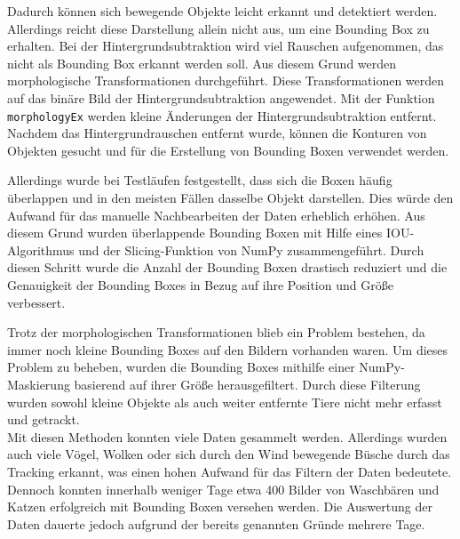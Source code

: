 Dadurch können sich bewegende Objekte leicht erkannt und detektiert werden. Allerdings reicht diese Darstellung allein nicht aus, um eine Bounding Box zu erhalten. Bei der Hintergrundsubtraktion wird viel Rauschen aufgenommen, das nicht als Bounding Box erkannt werden soll. Aus diesem Grund werden morphologische Transformationen durchgeführt. Diese Transformationen werden auf das binäre Bild der Hintergrundsubtraktion angewendet. Mit der Funktion \verb|morphologyEx| werden kleine Änderungen der Hintergrundsubtraktion entfernt.
\\
Nachdem das Hintergrundrauschen entfernt wurde, können die Konturen von Objekten gesucht und für die Erstellung von Bounding Boxen verwendet werden. 

Allerdings wurde bei Testläufen festgestellt, dass sich die Boxen häufig überlappen und in den meisten Fällen dasselbe Objekt darstellen. Dies würde den Aufwand für das manuelle Nachbearbeiten der Daten erheblich erhöhen. Aus diesem Grund wurden überlappende Bounding Boxen mit Hilfe eines \ac{IOU}-Algorithmus und der Slicing-Funktion von NumPy zusammengeführt. Durch diesen Schritt wurde die Anzahl der Bounding Boxen drastisch reduziert und die Genauigkeit der Bounding Boxes in Bezug auf ihre Position und Größe verbessert.

Trotz der morphologischen Transformationen blieb ein Problem bestehen, da immer noch kleine Bounding Boxes auf den Bildern vorhanden waren. Um dieses Problem zu beheben, wurden die Bounding Boxes mithilfe einer NumPy-Maskierung basierend auf ihrer Größe herausgefiltert. Durch diese Filterung wurden sowohl kleine Objekte als auch weiter entfernte Tiere nicht mehr erfasst und getrackt.
\\
Mit diesen Methoden konnten viele Daten gesammelt werden. Allerdings wurden auch viele Vögel, Wolken oder sich durch den Wind bewegende Büsche durch das Tracking erkannt, was einen hohen Aufwand für das Filtern der Daten bedeutete. Dennoch konnten innerhalb weniger Tage etwa 400 Bilder von Waschbären und Katzen erfolgreich mit Bounding Boxen versehen werden. Die Auswertung der Daten dauerte jedoch aufgrund der bereits genannten Gründe mehrere Tage.

